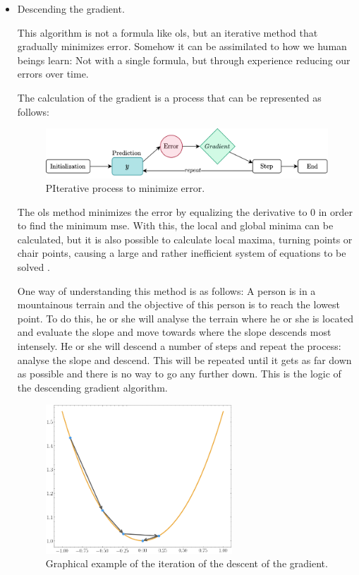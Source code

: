\begin{itemize}
\item Descending the gradient.

This algorithm is not a formula like \acrlong{ols}, but an iterative method that gradually minimizes error. Somehow it can be assimilated to how we human beings learn: Not with a single formula, but through experience reducing our errors over time.
\newline

The calculation of the gradient is a process that can be represented as follows:
\begin{figure}[H]
    \centering
    \includegraphics[width=13cm]{images/state-of-art/gradient-descent/gradient-algorithm.png}
    \caption{PIterative process to minimize error.}
    \label{fig:gradient_descent}
\end{figure}

The \acrshort{ols} method minimizes the error by equalizing the derivative to $0$ in order to find the minimum \acrshort{mse}. With this, the local and global minima can be calculated, but it is also possible to calculate local maxima, turning points or chair points, causing a large and rather inefficient system of equations to be solved \cite{papert}.
\newline

One way of understanding this method is as follows: A person is in a mountainous terrain and the objective of this person is to reach the lowest point. To do this, he or she will analyse the terrain where he or she is located and evaluate the slope and move towards where the slope descends most intensely. He or she will descend a number of steps and repeat the process: analyse the slope and descend. This will be repeated until it gets as far down as possible and there is no way to go any further down. This is the logic of the descending gradient algorithm.


\begin{figure}[H]
    \centering
    \includegraphics[width=7cm]{images/state-of-art/gradient-descent/gradient.png}
    \caption{Graphical example of the iteration of the descent of the gradient.}
    \label{fig:gradient_descent}
\end{figure}



\end{itemize}
